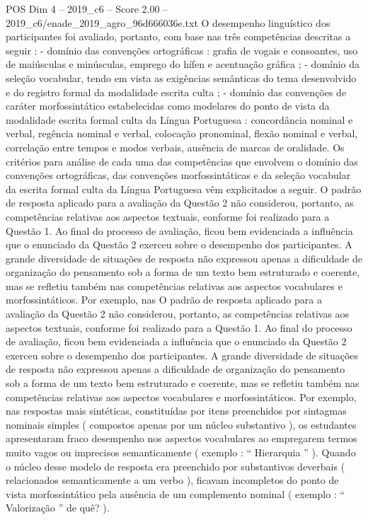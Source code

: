 \begin{textsample}{POS Dim 4 – 2019\_c6 – Score 2.00 – 2019\_c6/enade\_2019\_agro\_96d666036e.txt}
O desempenho linguístico dos participantes foi avaliado, portanto, com base nas três competências descritas a seguir : - domínio das convenções ortográficas : grafia de vogais e consoantes, uso de maiúsculas e minúsculas, emprego do hífen e acentuação gráfica ; - domínio da seleção vocabular, tendo em vista as exigências semânticas do tema desenvolvido e do registro formal da modalidade escrita culta ; - domínio das convenções de caráter morfossintático estabelecidas como modelares do ponto de vista da modalidade escrita formal culta da Língua Portuguesa : concordância nominal e verbal, regência nominal e verbal, colocação pronominal, flexão nominal e verbal, correlação entre tempos e modos verbais, ausência de marcas de oralidade.
Os critérios para análise de cada uma das competências que envolvem o domínio das convenções ortográficas, das convenções morfossintáticas e da seleção vocabular da escrita formal culta da Língua Portuguesa vêm explicitados a seguir.
O padrão de resposta aplicado para a avaliação da Questão 2 não considerou, portanto, as competências relativas aos aspectos textuais, conforme foi realizado para a Questão 1.
Ao final do processo de avaliação, ficou bem evidenciada a influência que o enunciado da Questão 2 exerceu sobre o desempenho dos participantes.
A grande diversidade de situações de resposta não expressou apenas a dificuldade de organização do pensamento sob a forma de um texto bem estruturado e coerente, mas se refletiu também nas competências relativas aos aspectos vocabulares e morfossintáticos.
Por exemplo, nas O padrão de resposta aplicado para a avaliação da Questão 2 não considerou, portanto, as competências relativas aos aspectos textuais, conforme foi realizado para a Questão 1.
Ao final do processo de avaliação, ficou bem evidenciada a influência que o enunciado da Questão 2 exerceu sobre o desempenho dos participantes.
A grande diversidade de situações de resposta não expressou apenas a dificuldade de organização do pensamento sob a forma de um texto bem estruturado e coerente, mas se refletiu também nas competências relativas aos aspectos vocabulares e morfossintáticos.
Por exemplo, nas respostas mais sintéticas, constituídas por itens preenchidos por sintagmas nominais simples ( compostos apenas por um núcleo substantivo ), os estudantes apresentaram fraco desempenho nos aspectos vocabulares ao empregarem termos muito vagos ou imprecisos semanticamente ( exemplo : “ Hierarquia ” ).
Quando o núcleo desse modelo de resposta era preenchido por substantivos deverbais ( relacionados semanticamente a um verbo ), ficavam incompletos do ponto de vista morfossintático pela ausência de um complemento nominal ( exemplo : “ Valorização ” de quê? ).

\end{textsample}
